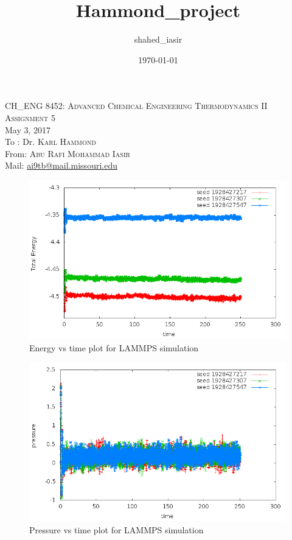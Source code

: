 \documentclass{article}
\title{Hammond_project}
\author{shahed_iasir }
\date{\today}
\begin{document}
\noindent CH{\_}ENG 8452:\textsc{  Advanced Chemical Engineering Thermodynamics II} \\
\textsc{Assignment 5}\\
May 3, 2017 \\
To : Dr. \textsc{Karl Hammond} \\
From: \textsc{Abu Rafi Mohammad Iasir}\\
Mail: \href{mailto:ai9tb@mail.missouri.edu}{ai9tb@mail.missouri.edu}

\begin{doublespacing}

\begin{figure}[H]
\begin{center}
\includegraphics[scale=0.8]{Energy_vs_step} 
\caption{Energy vs time plot for LAMMPS simulation}  
\label{EV_lammps} 
\end{center}
\end{figure}
\begin{figure}[H]
\begin{center}
\includegraphics[scale=0.8]{pressure_vs_time} 
\caption{Pressure vs time plot for LAMMPS simulation}  
\label{PV_lammps} 
\end{center}
\end{figure}


\end{doublespacing}
\end{document}
